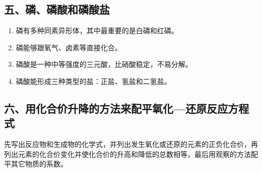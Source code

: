 \subsection*{五、磷、磷酸和磷酸盐}
\begin{enumerate}[1.]
  \item 磷有多种同素异形体，其中最重要的是白磷和红磷。
  \item 磷能够跟氧气、卤素等直接化合。
  \item 磷酸是一种中等强度的三元酸，比硝酸稳定，不易分解。
  \item 磷酸能形成三种类型的盐：正盐、氢盐和二氢盐。
\end{enumerate}
\subsection*{六、用化合价升降的方法来配平氧化—还原反应方程式}
先写出反应物和生成物的化学式，并列出发生氧化或还原的元素的正负化合价，再列出元素的化合价变化并使化合价的升高和降低的总数相等，最后用观察的方法配平其它物质的系数。

